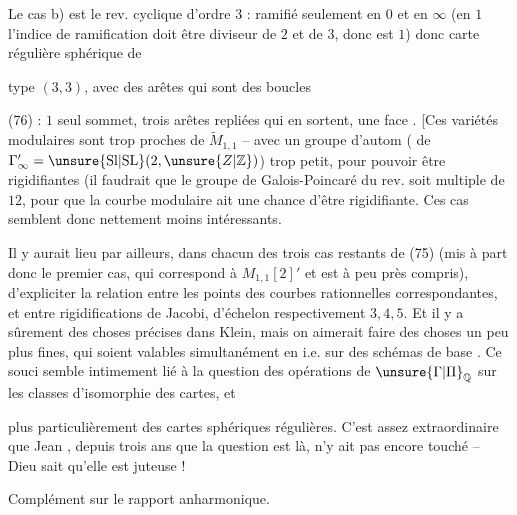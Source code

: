 Le cas b) est le rev. cyclique d'ordre $3$ :
ramifié seulement en $0$ et en $\infty$ (en $1$ l'indice de ramification doit être diviseur de $2$ et de $3$,
donc est $1$) donc carte régulière sphérique de


type $(3,3)$, avec des arêtes qui sont des boucles

(76) 
: $1$ seul sommet,
trois arêtes repliées qui en sortent, une face
. [Ces variétés modulaires sont
trop proches de $\widetilde M_{1,1}$ -- avec un groupe
d'autom ( de $\Gamma'_\infty=\unsure{\mathrm{Sl}|\mathrm{SL}}(2,\unsure{Z|\mathbb Z})$) trop petit,
pour pouvoir être rigidifiantes (il faudrait
que le groupe de Galois-Poincaré du rev.
soit multiple de $12$, pour que  la courbe modulaire ait une chance d'être rigidifiante. Ces
cas semblent donc nettement moins intéressants.

Il y aurait lieu par ailleurs, dans chacun des
trois cas restants de (75) (mis à part donc le
premier cas, qui correspond à $M_{1,1}[2]'$ et est
à peu près compris), d'expliciter la relation
entre les points des courbes rationnelles
correspondantes, et entre  rigidifications de
Jacobi, d'échelon respectivement $3,4,5$. Et il y
a sûrement des choses précises dans Klein,
mais on aimerait faire des choses un peu
plus fines, qui soient valables simultanément
en  i.e. sur des schémas
de base . Ce souci semble intimement lié à la question des opérations de
$\unsure{\Gamma|\Pi}_{\mathbb Q}$ sur les classes d'isomorphie des cartes, et


plus particulièrement des cartes sphériques
régulières. C'est assez extraordinaire que
Jean , depuis trois ans que la
question est là, n'y ait pas encore touché
-- Dieu sait qu'elle est juteuse !

Complément sur le rapport anharmonique.

